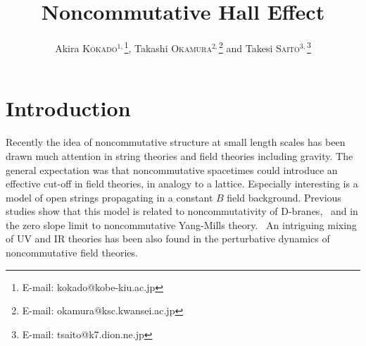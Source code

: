 \documentclass[a4paper,seceq]{ptptex}
\title{%
Noncommutative Hall Effect
}
\author{%
    Akira \textsc{Kokado}$^{1,}$\footnote{
                         E-mail: kokado@kobe-kiu.ac.jp},
    Takashi \textsc{Okamura}$^{2,}$\footnote{
                         E-mail: okamura@ksc.kwansei.ac.jp}
and Takesi \textsc{Saito}$^{3,}$\footnote{
                         E-mail: tsaito@k7.dion.ne.jp}
}
\begin{document}
\maketitle
\section{Introduction}
Recently the idea of noncommutative structure at small length scales
has been drawn much attention in string theories and
field theories including gravity.
The general expectation was that noncommutative spacetimes could
introduce an effective cut-off in field theories,
in analogy to a lattice. 
Especially interesting is a model of open strings propagating
in a constant $B$ field background.
Previous studies show that this model is related to
noncommutativity of D-branes,
\cite{rf:1} \ 
and in the zero slope limit
to noncommutative Yang-Mills theory.
\cite{rf:2} \ 
An intriguing mixing of UV and IR theories has been also found
in the perturbative dynamics of noncommutative field theories.
\cite{rf:3}
\end{document}
